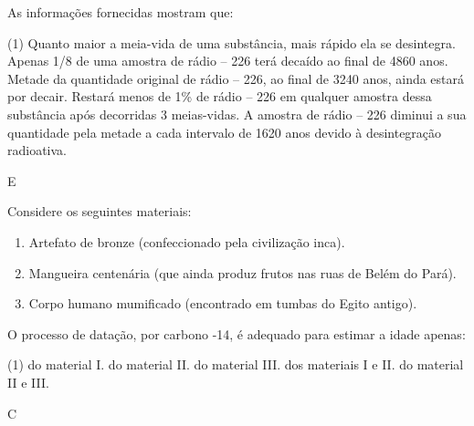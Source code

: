 \documentclass[9 pt]{scrartcl}
\begin{document}
\begin{exercise}[points=1.0]
As informações fornecidas mostram que:



\begin{choice}(1)
\choice Quanto maior a meia-vida de uma substância, mais rápido ela se desintegra.
\choice Apenas 1/8 de uma amostra de rádio – 226 terá decaído ao final de 4860 anos.
\choice Metade da quantidade original de rádio – 226, ao final de 3240 anos, ainda estará por decair.
\choice Restará menos de 1\% de rádio – 226 em qualquer amostra dessa substância após decorridas 3 meias-vidas.
\choice A amostra de rádio – 226 diminui a sua quantidade pela metade a cada intervalo de 1620 anos devido à desintegração radioativa.
\end{choice}
\end{exercise}
\begin{solution}
E
\end{solution}





\begin{exercise}[points=1.0]
Considere os seguintes materiais:

\begin{enumerate}[label=\Roman*]
\item Artefato de bronze (confeccionado pela civilização inca).
\item Mangueira centenária (que ainda produz frutos nas ruas de Belém do Pará).
\item Corpo humano mumificado (encontrado em tumbas do Egito antigo).
\end{enumerate}

O processo de datação, por carbono -14, é adequado para estimar a idade apenas:

\begin{choice}(1)
\choice do material I.
\choice do material II.
\choice do material III.
\choice dos materiais I e II.
\choice do material II e III.
\end{choice}
\end{exercise}
\begin{solution}
C
\end{solution}
\end{document}
